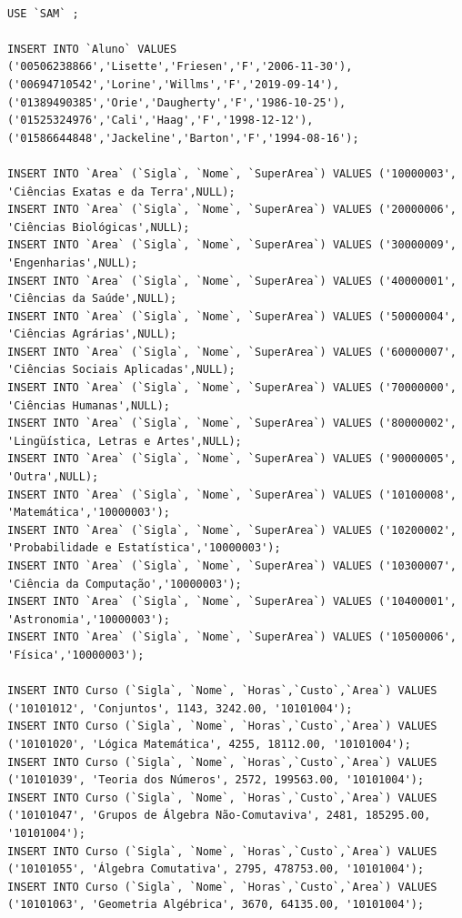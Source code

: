 \documentclass{article}
\begin{document}
%
%
\begin{verbatim}

USE `SAM` ;

INSERT INTO `Aluno` VALUES ('00506238866','Lisette','Friesen','F','2006-11-30'),
('00694710542','Lorine','Willms','F','2019-09-14'),
('01389490385','Orie','Daugherty','F','1986-10-25'),
('01525324976','Cali','Haag','F','1998-12-12'),
('01586644848','Jackeline','Barton','F','1994-08-16');

INSERT INTO `Area` (`Sigla`, `Nome`, `SuperArea`) VALUES ('10000003', 'Ciências Exatas e da Terra',NULL);
INSERT INTO `Area` (`Sigla`, `Nome`, `SuperArea`) VALUES ('20000006', 'Ciências Biológicas',NULL);
INSERT INTO `Area` (`Sigla`, `Nome`, `SuperArea`) VALUES ('30000009', 'Engenharias',NULL);
INSERT INTO `Area` (`Sigla`, `Nome`, `SuperArea`) VALUES ('40000001', 'Ciências da Saúde',NULL);
INSERT INTO `Area` (`Sigla`, `Nome`, `SuperArea`) VALUES ('50000004', 'Ciências Agrárias',NULL);
INSERT INTO `Area` (`Sigla`, `Nome`, `SuperArea`) VALUES ('60000007', 'Ciências Sociais Aplicadas',NULL);
INSERT INTO `Area` (`Sigla`, `Nome`, `SuperArea`) VALUES ('70000000', 'Ciências Humanas',NULL);
INSERT INTO `Area` (`Sigla`, `Nome`, `SuperArea`) VALUES ('80000002', 'Lingüística, Letras e Artes',NULL);
INSERT INTO `Area` (`Sigla`, `Nome`, `SuperArea`) VALUES ('90000005', 'Outra',NULL);
INSERT INTO `Area` (`Sigla`, `Nome`, `SuperArea`) VALUES ('10100008', 'Matemática','10000003');
INSERT INTO `Area` (`Sigla`, `Nome`, `SuperArea`) VALUES ('10200002', 'Probabilidade e Estatística','10000003');
INSERT INTO `Area` (`Sigla`, `Nome`, `SuperArea`) VALUES ('10300007', 'Ciência da Computação','10000003');
INSERT INTO `Area` (`Sigla`, `Nome`, `SuperArea`) VALUES ('10400001', 'Astronomia','10000003');
INSERT INTO `Area` (`Sigla`, `Nome`, `SuperArea`) VALUES ('10500006', 'Física','10000003');

INSERT INTO Curso (`Sigla`, `Nome`, `Horas`,`Custo`,`Area`) VALUES ('10101012', 'Conjuntos', 1143, 3242.00, '10101004');
INSERT INTO Curso (`Sigla`, `Nome`, `Horas`,`Custo`,`Area`) VALUES ('10101020', 'Lógica Matemática', 4255, 18112.00, '10101004');
INSERT INTO Curso (`Sigla`, `Nome`, `Horas`,`Custo`,`Area`) VALUES ('10101039', 'Teoria dos Números', 2572, 199563.00, '10101004');
INSERT INTO Curso (`Sigla`, `Nome`, `Horas`,`Custo`,`Area`) VALUES ('10101047', 'Grupos de Álgebra Não-Comutaviva', 2481, 185295.00, '10101004');
INSERT INTO Curso (`Sigla`, `Nome`, `Horas`,`Custo`,`Area`) VALUES ('10101055', 'Álgebra Comutativa', 2795, 478753.00, '10101004');
INSERT INTO Curso (`Sigla`, `Nome`, `Horas`,`Custo`,`Area`) VALUES ('10101063', 'Geometria Algébrica', 3670, 64135.00, '10101004');
\end{verbatim}
\end{document}
